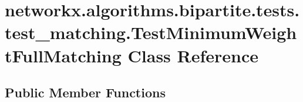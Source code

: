\hypertarget{classnetworkx_1_1algorithms_1_1bipartite_1_1tests_1_1test__matching_1_1TestMinimumWeightFullMatching}{}\section{networkx.\+algorithms.\+bipartite.\+tests.\+test\+\_\+matching.\+Test\+Minimum\+Weight\+Full\+Matching Class Reference}
\label{classnetworkx_1_1algorithms_1_1bipartite_1_1tests_1_1test__matching_1_1TestMinimumWeightFullMatching}
\subsection*{Public Member Functions}
